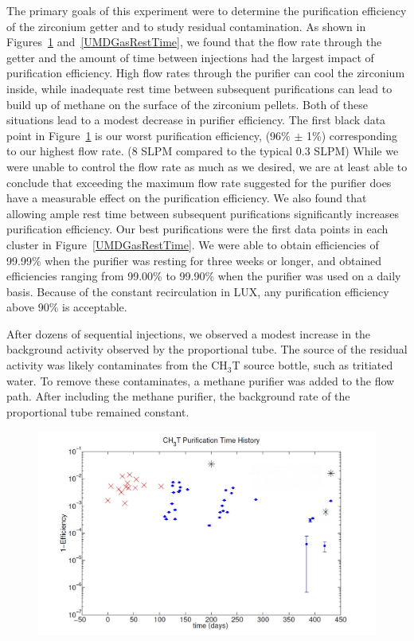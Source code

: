 The primary goals of this experiment were to determine the purification efficiency of the zirconium getter and to study residual contamination.  As shown in Figures~\ref{UMDGasFlowRate} and~\ref{UMDGasRestTime}, we found that the flow rate through the getter and the amount of time between injections had the largest impact of purification efficiency.  High  flow rates through the purifier can cool the zirconium inside, while inadequate rest time between subsequent purifications can lead to build up of methane on the surface of the zirconium pellets. Both of these situations lead to a modest decrease in purifier efficiency. The first black data point in Figure~\ref{UMDGasFlowRate} is our worst purification efficiency, (96\% $\pm$ 1\%) corresponding to our highest flow rate. (8 SLPM compared to the typical 0.3 SLPM) While we were unable to control the  flow rate as much as we desired, we are at least able to conclude that exceeding the maximum flow rate suggested for the purifier does have a measurable effect on the purification efficiency. We also found that allowing ample rest time between subsequent purifications significantly increases purification efficiency. Our best purifications were the first data points in each cluster in Figure~\ref{UMDGasRestTime}. We were able to obtain efficiencies of 99.99\% when the purifier was resting for three weeks or longer, and obtained efficiencies ranging from 99.00\% to 99.90\% when the purifier was used on a daily basis.  Because of the constant recirculation in LUX, any purification efficiency above 90\% is acceptable.

After dozens of sequential injections, we observed a modest increase in the background activity observed by the proportional tube.  The source of the residual activity was likely contaminates from the CH$_3$T source bottle, such as tritiated water.  To remove these contaminates, a methane purifier was added to the flow path.  After including the methane purifier, the background rate of the proportional tube remained constant.

\begin{figure}
\includegraphics[scale=.45]{GasPhaseRemoval_FlowRate.jpg} 
\label{UMDGasFlowRate}
\end{figure}

